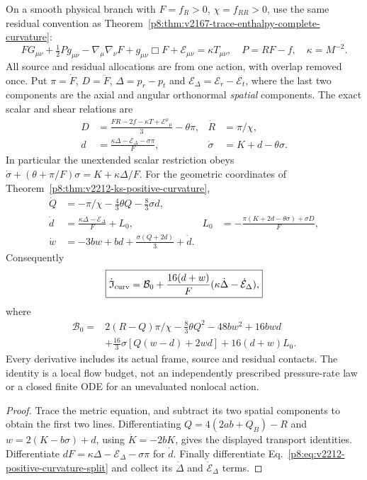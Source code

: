 \documentclass[12pt,a4paper]{article}
\begin{document}
\begin{theorem}
\label{p8:thm:v2212-residual-flow-budget}
On a smooth physical branch with $F=f_R>0$, $\chi=f_{RR}>0$, use the
same residual convention as
Theorem~\ref{p8:thm:v2167-trace-enthalpy-complete-curvature}:
\[
 F G_{\mu\nu}+\tfrac12P g_{\mu\nu}
 -\nabla_\mu\nabla_\nu F+g_{\mu\nu}\Box F
 +\mathcal E_{\mu\nu}=\kappa T_{\mu\nu},
 \quad P=RF-f,\quad\kappa=M^{-2}.
\]
All source and residual allocations are from one action, with overlap
removed once. Put $\pi=\dot F$, $D=\ddot F$,
$\Delta=p_r-p_t$ and $\mathcal E_\Delta=\mathcal E_r-\mathcal E_t$,
where the last two components are the axial and angular orthonormal
\emph{spatial} components. The exact scalar and shear relations are
\begin{align}
 D&=\frac{FR-2f-\kappa T+\mathcal E^\mu{}_{\mu}}3-\theta\pi,
 &\dot R&=\pi/\chi,\label{p8:eq:v2212-residual-trace}\\
 d&=\frac{\kappa\Delta-\mathcal E_\Delta-\sigma\pi}{F},
 &\dot\sigma&=K+d-\theta\sigma.
 \label{p8:eq:v2212-residual-shear}
\end{align}
In particular the unextended scalar restriction obeys
$\dot\sigma+(\theta+\pi/F)\sigma=K+\kappa\Delta/F$.
For the geometric coordinates of
Theorem~\ref{p8:thm:v2212-ks-positive-curvature},
\begin{align}
 \dot Q&=-\pi/\chi-\tfrac43\theta Q-\tfrac83\sigma d,\\
 \dot d&=\frac{\kappa\dot\Delta-\dot{\mathcal E}_\Delta}{F}+L_0,
 &L_0&=-\frac{\pi(K+2d-\theta\sigma)+\sigma D}{F},\\
 \dot w&=-3bw+bd+\frac{\sigma(Q+2d)}3+\dot d.
\end{align}
Consequently
\begin{equation}
\label{p8:eq:v2212-complete-curvature-flow}
 \boxed{\dot{\mathfrak I}_{\rm curv}
 =\mathcal B_0+\frac{16(d+w)}F
       (\kappa\dot\Delta-\dot{\mathcal E}_\Delta),}
\end{equation}
where
\begin{align*}
 \mathcal B_0={}&2(R-Q)\pi/\chi-\tfrac83\theta Q^2
 -48bw^2+16bwd\\
 &+\tfrac{16}3\sigma[Q(w-d)+2wd]+16(d+w)L_0.
\end{align*}
Every derivative includes its actual frame, source and residual contacts.
The identity is a local flow budget, not an independently prescribed
pressure-rate law or a closed finite ODE for an unevaluated nonlocal action.
\end{theorem}
\begin{proof}
Trace the metric equation, and subtract its two spatial components to
obtain the first two lines. Differentiating $Q=4(2ab+Q_B)-R$ and
$w=2(K-b\sigma)+d$, using $\dot K=-2bK$, gives the displayed transport
identities. Differentiate $dF=\kappa\Delta-\mathcal E_\Delta-\sigma\pi$
for $\dot d$. Finally differentiate
Eq.~\eqref{p8:eq:v2212-positive-curvature-split} and collect its
$\dot\Delta$ and $\dot{\mathcal E}_\Delta$ terms.
\end{proof}
\end{document}
